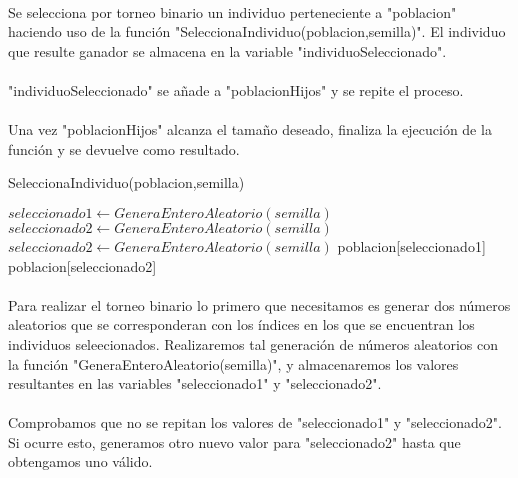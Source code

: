 	\paragraph{} Se selecciona por torneo binario un individuo perteneciente a "poblacion" haciendo uso de la función "SeleccionaIndividuo(poblacion,semilla)". El individuo que resulte ganador se almacena en la variable "individuoSeleccionado".
	
	\paragraph{}"individuoSeleccionado" se añade a "poblacionHijos" y se repite el proceso.
	
	\paragraph{}Una vez "poblacionHijos" alcanza el tamaño deseado, finaliza la ejecución de la función y se devuelve como resultado.

	\begin{algorithm}[H]
		\caption{SeleccionaIndividuo(poblacion,semilla)}
		\begin{algorithmic}
			\STATE $seleccionado1 \leftarrow GeneraEnteroAleatorio(semilla)$
			\STATE $seleccionado2 \leftarrow GeneraEnteroAleatorio(semilla)$
			\STATE $seleccionado2 \leftarrow GeneraEnteroAleatorio(semilla)$
			\ENDWHILE
			\RETURN poblacion[seleccionado1]
			\ELSE
			\RETURN poblacion[seleccionado2]
			\ENDIF
		\end{algorithmic}
	\end{algorithm}

	\paragraph{}Para realizar el torneo binario lo primero que necesitamos es generar dos números aleatorios que se corresponderan con los índices en los que se encuentran los individuos seleecionados. Realizaremos tal generación de números aleatorios con la función "GeneraEnteroAleatorio(semilla)", y almacenaremos los valores resultantes en las variables "seleccionado1" y "seleccionado2".
	
	\paragraph{}Comprobamos que no se repitan los valores de "seleccionado1" y "seleccionado2". Si ocurre esto, generamos otro nuevo valor para "seleccionado2" hasta que obtengamos uno válido.
	
